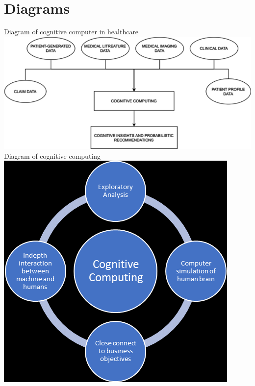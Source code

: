 \documentclass{article}
\begin{document}
\section{Diagrams}
Diagram of cognitive computer in healthcare \\
\includegraphics[scale=0.5]{Healthcare} \\
Diagram of cognitive computing \\
\includegraphics[scale=0.5]{Cognitive} \\

\break

\end{document}
